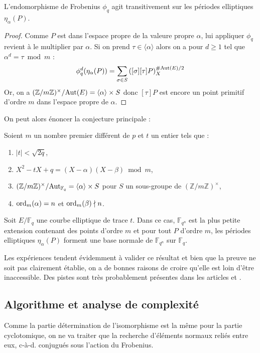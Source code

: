 \documentclass[a4paper]{article} %
\numberwithin{section}{part}
\numberwithin{equation}{section}
\newcommand\zmodninv[1]{(\mathbb{Z}/#1\mathbb{Z})^{\times}}
\newcommand\GF[1]{\mathbb{F}_{#1}}
\newcommand\groupgen[1]{\langle{#1}\rangle}
\newcommand\ord[2]{\textup{ord}_{#1}(#2)}
\begin{document}
\begin{prop}
L'endomorphisme de Frobenius $\phi_q$ agit transitivement sur les périodes 
elliptiques $\eta_{\alpha}(P)$.
\end{prop}
\begin{proof}
Comme $P$ est dans l'espace propre de la valeure propre $\alpha$, lui appliquer 
$\phi_q$ revient à le multiplier par $\alpha$. Si on prend 
$\tau\in\groupgen{\alpha}$ alors on a pour $d\geq1$ tel que $\alpha^d = \tau 
\bmod m$ :
\begin{equation}
\phi_q^d(\eta_{\alpha}(P)) = \sum_{\sigma\in
S}{\left([\sigma][\tau]P\right)_X^{\#\textup{Aut}(E)/2}}
\end{equation}
Or, on a $\zmodninv{m}/\textup{Aut}(E) = \groupgen{\alpha} \times S$ donc
$[\tau]P$ est encore un point primitif d'ordre $m$ dans l'espace propre de 
$\alpha$.
\end{proof}
On peut alors énoncer la conjecture principale :
\begin{conj}
\label{conj:gaussellnorm}
Soient $m$ un nombre premier différent de $p$ et $t$ un entier tels que :
\vspace{0.3cm}
\begin{enumerate}[1.]
    \item $|t| < \sqrt{2q}$,
    \item $X^2 - tX + q = (X - \alpha)(X - \beta)\bmod{m}$,
    \item $\zmodninv{m}/\textup{Aut}_{\GF{q}} = \groupgen{\alpha}\times S$ pour
    $S$ un sous-groupe de $\zmodninv{m}$,
    \item $\ord{m}{\alpha} = n$ et $\ord{m}{\beta}\nmid n$.
\end{enumerate}
\vspace{0.3cm}
Soit $E/\GF{q}$ une courbe elliptique de trace $t$. Dans ce cas, $\GF{q^n}$ est
la plus petite extension contenant des points d'ordre $m$ et pour tout $P$ 
d'ordre $m$, les périodes elliptiques $\eta_{\alpha}(P)$ forment une base
normale de $\GF{q^n}$ sur $\GF{q}$.
\end{conj}
\begin{rem}
Les expériences tendent évidemment à valider ce résultat et bien que la preuve 
ne soit pas clairement établie, on a de bonnes raisons de croire qu'elle est 
loin d'être inaccessible. Des pistes sont très probablement présentes dans 
les articles \cite{MiMoScho} et \cite{CouRe}. 
\end{rem}

\subsection{Algorithme et analyse de complexité}
\label{sec:algcompell}
Comme la partie détermination de l'isomorphisme est la même pour la partie
cyclotomique, on ne va traiter que la recherche d'éléments normaux reliés entre
eux, c-à-d. conjugués sous l'action du Frobenius.\par
\end{document}
